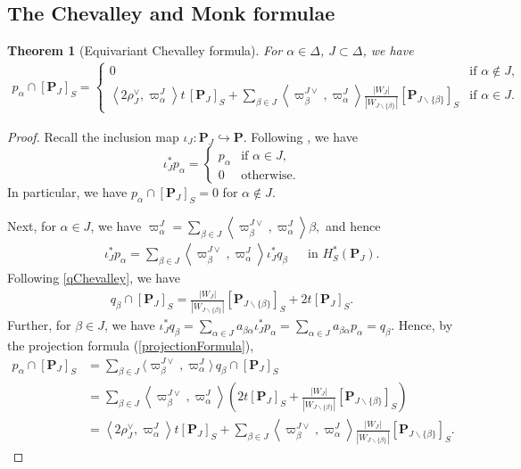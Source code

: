 \documentclass[10pt]{article}
\newtheorem{thm}{Theorem}
\numberwithin{thm}{section}
\theoremstyle{definition}
\theoremstyle{remark}
\newcommand{\Pet}{\ensuremath{\mathbf{P}}}
\begin{document}
\subsection{The Chevalley and Monk formulae}
\begin{thm}[Equivariant Chevalley formula]
\label{thm:chevalley}
For $\alpha\in\Delta$, $J\subset\Delta$, we have
\begin{align*}
p_\alpha\cap[\Pet_J]_S=
\begin{cases}
0 &\text{if }\alpha\not\in J,\\
\left\langle2\rho_J^\vee,\varpi^J_\alpha\right\rangle t\,[\Pet_J]_S+
 \sum\limits_{\beta\in J}
\left\langle\varpi^{J\vee}_\beta,\varpi^J_\alpha\right\rangle
\frac{|W_J|}{|W_{J\backslash \{\beta\}}|}[\Pet_{J\backslash \{\beta\}}]_S
&\text{if }\alpha\in J.
\end{cases}
\end{align*}
\end{thm}
\begin{proof}
Recall the inclusion map $\iota_J:\Pet_J\hookrightarrow\Pet$.
Following \cite[Thm. 6.6(b)]{gms:peterson}, we have 
\begin{equation*}\iota_J^*p_\alpha=
\begin{cases}
p_\alpha & \text{if }\alpha\in J,\\
0        & \text{otherwise}.
\end{cases}
\end{equation*}
In particular, we have $p_\alpha\cap[\Pet_J]_S=0$ for $\alpha\not\in J$.

Next, for $\alpha\in J$, we have 
$
\varpi^J_\alpha = \sum_{\beta\in J} \left\langle \varpi^{J\vee}_\beta,\varpi^J_\alpha\right\rangle \beta,
$
and hence
\begin{align*}
&&\iota_J^*p_\alpha =\sum_{\beta\in J} \left\langle \varpi^{J\vee}_\beta,\varpi^J_\alpha\right\rangle \iota_J^* q_\beta 
&&\text{in }H^*_S(\Pet_J).
\end{align*}
Following \cref{qChevalley}, we have
\begin{align*}
&&q_\beta\cap[\Pet_J]_S
=\frac{|W_J|}{|W_{J\backslash\{\beta\}}|}[\Pet_{J\backslash\{\beta\}}]_S+2t[\Pet_J]_S.
&&
\end{align*}
Further, for $\beta\in J$, we have $\iota_J^*q_\beta=\sum_{\alpha\in J}a_{\beta\alpha}\iota_J^*p_\alpha=\sum_{\alpha\in J}a_{\beta\alpha}p_\alpha=q_\beta$.
Hence, by the projection formula (\cref{projectionFormula}),
\begin{align*}
p_\alpha\cap[\Pet_J]_S&=\sum_{\beta\in J}\langle \varpi^{J\vee}_\beta,\varpi^J_\alpha\rangle\, q_\beta \cap [\Pet_J]_S \\
&=
\sum_{\beta\in J}
\left\langle\varpi^{J\vee}_\beta,\varpi^J_\alpha\right\rangle
\left(
2t [\Pet_J]_S+
\frac{|W_J|}{|W_{J\backslash\{\beta\}}|}[\Pet_{J\backslash\{\beta\}}]_S\right)
\\
&=
\left\langle2\rho_J^\vee,\varpi^J_\alpha\right\rangle t
[\Pet_J]_S+
\sum_{\beta\in J}
\left\langle\varpi^{J\vee}_\beta,\varpi^J_\alpha\right\rangle
\frac{|W_J|}{|W_{J\backslash\{\beta\}}|}[\Pet_{J\backslash\{\beta\}}]_S.
\end{align*}
\end{proof}
\end{document}
